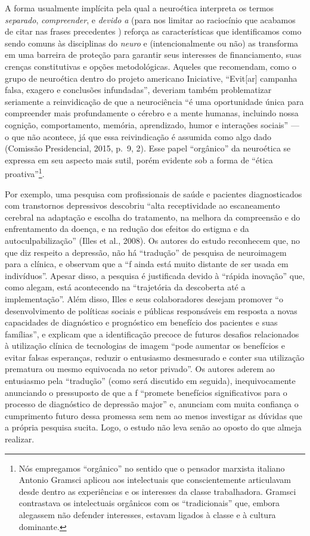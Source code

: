 A forma usualmente implícita pela qual a neuroética interpreta os termos
\emph{separado}, \emph{compreender}, e \emph{devido a} (para nos limitar
ao raciocínio que acabamos de citar nas frases precedentes ) reforça as
características que identificamos como sendo comuns às disciplinas do
\emph{neuro} e (intencionalmente ou não) as transforma em uma barreira
de proteção para garantir seus interesses de financiamento, suas crenças
constitutivas e opções metodológicas. Aqueles que recomendam, como o
grupo de neuroética dentro do projeto americano  Iniciative,
``Evit{[}ar{]} campanha falsa, exagero e conclusões infundadas'',
deveriam também problematizar seriamente a reinvidicação de que a
neurociência ``é uma oportunidade única para compreender mais
profundamente o cérebro e a mente humanas, incluindo nossa cognição,
comportamento, memória, aprendizado, humor e interações sociais'' --- o
que não acontece, já que essa reivindicação é assumida como algo dado
(Comissão Presidencial, 2015, p.~9, 2). Esse papel ``orgânico'' da
neuroética se expressa em seu aspecto mais sutil, porém evidente sob a
forma de ``ética proativa''\footnote[4]{Nós empregamos ``orgânico'' no sentido que o pensador marxista
italiano Antonio Gramsci aplicou aos intelectuais que conscientemente
articulavam desde dentro as experiências e os interesses da classe
trabalhadora. Gramsci contrastava os intelectuais orgânicos com os
``tradicionais'' que, embora alegassem não defender interesses, estavam
ligados à classe e à cultura dominante.}.

Por exemplo, uma pesquisa com profissionais de saúde e pacientes
diagnosticados com transtornos depressivos descobriu ``alta
receptividade ao escaneamento cerebral na adaptação e escolha do
tratamento, na melhora da compreensão e do enfrentamento da doença, e na
redução dos efeitos do estigma e da autoculpabilização'' (Illes et al.,
2008). Os autores do estudo reconhecem que, no que diz respeito a
depressão, não há ``tradução'' de pesquisa de neuroimagem para a
clínica, e observam que a ``f ainda está muito distante de ser usada
em indivíduos''. Apesar disso, a pesquisa é justificada devido à
``rápida inovação'' que, como alegam, está acontecendo na ``trajetória
da descoberta até a implementação''. Além disso, Illes e seus
colaboradores desejam promover ``o desenvolvimento de políticas sociais
e públicas responsáveis em resposta a novas capacidades de diagnóstico e
prognóstico em benefício dos pacientes e suas famílias'', e explicam que
a identificação precoce de futuros desafios relacionados à utilização
clínica de tecnologias de imagem ``pode aumentar os benefícios e evitar
falsas esperanças, reduzir o entusiasmo desmesurado e conter sua
utilização prematura ou mesmo equivocada no setor privado''. Os autores
aderem ao entusiasmo pela ``tradução'' (como será discutido em seguida),
inequivocamente anunciando o pressuposto de que a f ``promete
benefícios significativos para o processo de diagnóstico de depressão
major'' e, anunciam com muita confiança o cumprimento futuro dessa
promessa sem nem ao menos investigar as dúvidas que a própria pesquisa
sucita. Logo, o estudo não leva senão ao oposto do que almeja realizar.

